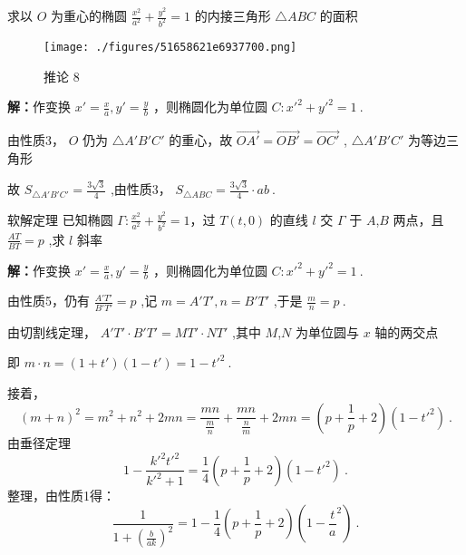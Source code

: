 \begin{corollary}{}
求以 $\displaystyle{O}$ 为重心的椭圆 $\displaystyle{\frac{x^2}{a^2}+\frac{y^2}{b^2}=1}$ 的内接三角形 $\displaystyle{\triangle ABC}$ 的面积
\begin{figure}[ht]
\centering
\texttt{[image: ./figures/51658621e6937700.png]}
\caption{推论 8} \label{fig_affine_7}
\end{figure}
\textbf{解：}作变换 $\displaystyle{x'=\frac{x}{a},y'=\frac{y}{b}}$ ，则椭圆化为单位圆 $\displaystyle{C:x'^2+y'^2=1}~.$

由性质3， $\displaystyle{O}$ 仍为 $\displaystyle{\triangle A'B'C'}$ 的重心，故 $\displaystyle{\vec{OA'}=\vec{OB'}=\vec{OC'}}$  , $\displaystyle{\triangle A'B'C'}$ 为等边三角形

故 $\displaystyle{S_{\triangle A'B'C'}=\frac{3\sqrt{3}}{4}}$ ,由性质3， $\displaystyle{S_{\triangle ABC}=\frac{3\sqrt{3}}{4}\cdot ab}~.$ 
\end{corollary}
\begin{corollary}{软解定理}
已知椭圆 $\displaystyle{\Gamma:\frac{x^2}{a^2}+\frac{y^2}{b^2}=1}$，过 $\displaystyle{T(t,0)}$ 的直线 $\displaystyle{l}$ 交 $\displaystyle{\Gamma}$ 于 $\displaystyle{A}$,$\displaystyle{B}$ 两点，且 $\displaystyle{\frac{AT}{BT}=p}$ ,求 $\displaystyle{l}$ 斜率

\textbf{解：}作变换 $\displaystyle{x'=\frac{x}{a},y'=\frac{y}{b}}$ ，则椭圆化为单位圆 $\displaystyle{C:x'^2+y'^2=1}~.$

由性质5，仍有 $\displaystyle{\frac{A'T'}{B'T'}=p}$ ,记 $\displaystyle{m=A'T',n=B'T'}$ ,于是 $\displaystyle{\frac{m}{n}=p}~.$ 

由切割线定理， $\displaystyle{A'T'\cdot B'T'=MT'\cdot NT'}$ ,其中 $\displaystyle{M}$,$\displaystyle{N}$ 为单位圆与 $\displaystyle{x}$ 轴的两交点

即 $\displaystyle{m\cdot n=(1+t')(1-t')=1-t'^2}~.$ 

接着，
$$(m+n)^2=m^2+n^2+2mn=\frac{mn}{\frac{m}{n}}+\frac{mn}{\frac{n}{m}}+2mn=\left(p+\frac{1}{p}+2\right)(1-t'^2)~.$$
由垂径定理
$$1-\frac{k'^2t'^2}{k'^2+1}=\frac{1}{4}\left(p+\frac{1}{p}+2\right)(1-t'^2)~.$$ 
整理，由性质1得：
$$\frac{1}{1+(\frac{b}{ak})^2}=1-\frac{1}{4}\left(p+\frac{1}{p}+2\right)\left(1-\frac{t}{a}^2\right)~.$$

\end{corollary}

